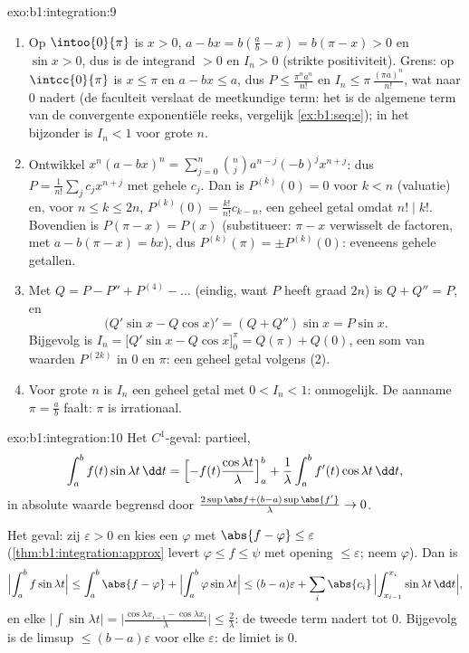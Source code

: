 \begin{solution}{exo:b1:integration:9}
\begin{enumerate}
  \item Op $\intoo{0}{\pi}$ is $x > 0$, $a - bx = b(\frac ab - x) =
        b(\pi - x) > 0$ en $\sin x > 0$, dus is de integrand $> 0$
        en $I_n > 0$ (strikte positiviteit). Grens: op
        $\intcc{0}{\pi}$ is $x \leq \pi$ en $a - bx \leq a$, dus $P
        \leq \frac{\pi^n a^n}{n!}$ en $I_n \leq \pi\,\frac{(\pi
        a)^n}{n!}$, wat naar $0$ nadert (de faculteit verslaat de
        meetkundige term: het is de algemene term van de
        convergente exponentiële reeks, vergelijk
        \cref{ex:b1:seq:e}); in het bijzonder is $I_n < 1$ voor
        grote $n$.
  \item Ontwikkel $x^n(a - bx)^n = \sum_{j=0}^{n} \binom nj a^{n-j}
        (-b)^j x^{n+j}$: dus $P = \frac{1}{n!}\sum_j c_j x^{n+j}$
        met gehele $c_j$. Dan is $P^{(k)}(0) = 0$ voor $k < n$
        (valuatie) en, voor $n \leq k \leq 2n$, $P^{(k)}(0) =
        \frac{k!}{n!} c_{k-n}$, een geheel getal omdat $n! \mid
        k!$. Bovendien is $P(\pi - x) = P(x)$ (substitueer: $\pi -
        x$ verwisselt de factoren, met $a - b(\pi - x) = bx$), dus
        $P^{(k)}(\pi) = \pm P^{(k)}(0)$: eveneens gehele getallen.
  \item Met $Q = P - P'' + P^{(4)} - \dots$ (eindig, want $P$ heeft
        graad $2n$) is $Q + Q'' = P$, en
        \[
        \bigl(Q'\sin x - Q\cos x\bigr)' = (Q + Q'')\sin x = P\sin x .
        \]
        Bijgevolg is $I_n = \bigl[Q'\sin x - Q\cos x\bigr]_0^{\pi}
        = Q(\pi) + Q(0)$, een som van waarden $P^{(2k)}$ in $0$ en
        $\pi$: een geheel getal volgens (2).
  \item Voor grote $n$ is $I_n$ een geheel getal met $0 < I_n < 1$:
        onmogelijk. De aanname $\pi = \frac ab$ faalt: $\pi$ is
        irrationaal.
\end{enumerate}
\end{solution}

\begin{solution}{exo:b1:integration:10}
Het $C^1$-geval: partieel,
\[
\int_a^b f(t)\sin\lambda t\,\dd t
= \Bigl[-f(t)\frac{\cos\lambda t}{\lambda}\Bigr]_a^b
+ \frac{1}{\lambda}\int_a^b f'(t)\cos\lambda t\,\dd t,
\]
in absolute waarde begrensd door $\frac{2\sup\abs f + (b -
a)\sup\abs{f'}}{\lambda} \to 0$.

Het  geval: zij $\varepsilon > 0$ en kies een 
$\varphi$ met $\abs{f - \varphi} \leq \varepsilon$
(\cref{thm:b1:integration:approx} levert $\varphi \leq f \leq \psi$
met opening $\leq\varepsilon$; neem $\varphi$). Dan is
\[
\Bigl|\int_a^b f\sin\lambda t\Bigr|
\leq \int_a^b \abs{f - \varphi}
+ \Bigl|\int_a^b \varphi \sin\lambda t\Bigr|
\leq (b-a)\varepsilon
+ \sum_i \abs{c_i}\,\Bigl|\int_{x_{i-1}}^{x_i} \sin\lambda t\,\dd
t\Bigr| ,
\]
en elke $\bigl|\int \sin \lambda t\bigr| =
\bigl|\frac{\cos\lambda x_{i-1} - \cos\lambda x_i}{\lambda}\bigr|
\leq \frac{2}{\lambda}$: de tweede term nadert tot $0$. Bijgevolg is
de limsup $\leq (b-a)\varepsilon$ voor elke $\varepsilon$: de limiet
is $0$.
\end{solution}

